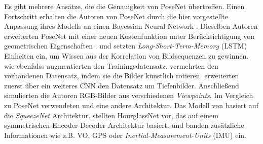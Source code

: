 Es gibt mehrere Ansätze, die die Genauigkeit von PoseNet übertreffen.
Einen Fortschritt erhalten die Autoren von PoseNet durch die hier \cite{kendallModellingUncertaintyDeep2016} vorgestellte Anpassung ihres Modells an einen Bayessian Neural Network \cite{denkerTransformingNeuralNetOutput1991}.
Dieselben Autoren erweiterten PoseNet mit einer neuen Kostenfunktion unter Berücksichtigung von geometrischen Eigenschaften \cite{kendallGeometricLossFunctions2017}. \citet{walchImageBasedLocalizationUsing2017} und \citet{clarkVidLocDeepSpatioTemporal2017} setzten \textit{Long-Short-Term-Memory} (LSTM) \cite{hochreiterLongShortTermMemory1997} Einheiten ein, um Wissen aus der Korrelation von Bildsequenzen zu gewinnen. \citet{wuDelvingDeeperConvolutional2017} wie ebenfalss \citet{naseerDeepRegressionMonocular2017} augmentierten den Trainingsdatensatz. \citet{wuDelvingDeeperConvolutional2017} vermehrten den vorhandenen Datensatz, indem sie die Bilder künstlich rotieren. \citet{naseerDeepRegressionMonocular2017} erweiterten zuerst über ein weiteres CNN den Datensatz um Tiefenbilder. Anschließend simulierten die Autoren RGB-Bilder aus verschiedenen \textit{Viewpoints}. Im Vergleich zu PoseNet verwendeten \citet{mullerSQUEEZEPOSENETIMAGEBASED2017} und \citet{melekhovImageBasedLocalizationUsing2017} eine andere Architektur. 
Das Modell von \citet{mullerSQUEEZEPOSENETIMAGEBASED2017} basiert auf die \textit{SqueezeNet} \cite{iandolaSqueezeNetAlexNetlevelAccuracy2016} Architektur. \citet{melekhovImageBasedLocalizationUsing2017a} stellten HourglassNet vor, das auf einem symmetrischen Encoder-Decoder Architektur basiert. \citet{brahmbhattGeometryAwareLearningMaps2018} und \citet{valadaDeepAuxiliaryLearning2018, valadaIncorporatingSemanticGeometric2018} banden zusätzliche Informationen wie z.B. VO, GPS oder \textit{Inertial-Measurement-Units} (IMU) ein. 

